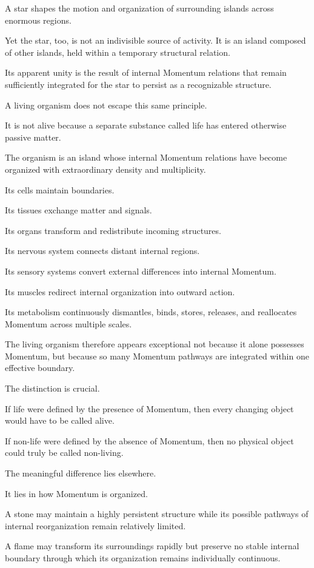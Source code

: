 A star shapes the motion and organization of surrounding islands across enormous regions.

Yet the star, too, is not an indivisible source of activity. It is an island composed of other islands, held within a temporary structural relation.

Its apparent unity is the result of internal Momentum relations that remain sufficiently integrated for the star to persist as a recognizable structure.

A living organism does not escape this same principle.

It is not alive because a separate substance called life has entered otherwise passive matter.

The organism is an island whose internal Momentum relations have become organized with extraordinary density and multiplicity.

Its cells maintain boundaries.

Its tissues exchange matter and signals.

Its organs transform and redistribute incoming structures.

Its nervous system connects distant internal regions.

Its sensory systems convert external differences into internal Momentum.

Its muscles redirect internal organization into outward action.

Its metabolism continuously dismantles, binds, stores, releases, and reallocates Momentum across multiple scales.

The living organism therefore appears exceptional not because it alone possesses Momentum, but because so many Momentum pathways are integrated within one effective boundary.

The distinction is crucial.

If life were defined by the presence of Momentum, then every changing object would have to be called alive.

If non-life were defined by the absence of Momentum, then no physical object could truly be called non-living.

The meaningful difference lies elsewhere.

It lies in how Momentum is organized.

A stone may maintain a highly persistent structure while its possible pathways of internal reorganization remain relatively limited.

A flame may transform its surroundings rapidly but preserve no stable internal boundary through which its organization remains individually continuous.

